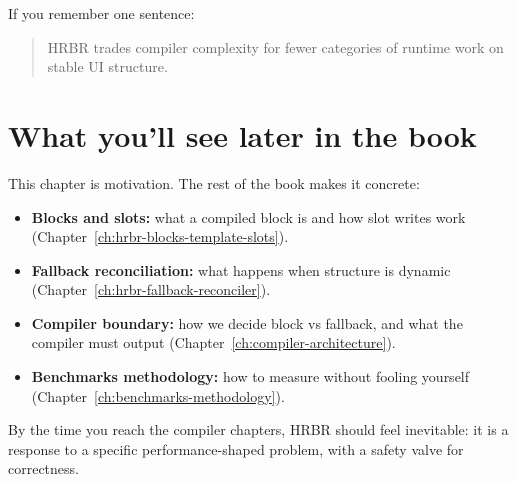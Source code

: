 If you remember one sentence:

\begin{quote}
HRBR trades compiler complexity for fewer categories of runtime work on stable UI structure.
\end{quote}

\section{What you'll see later in the book}

This chapter is motivation.
The rest of the book makes it concrete:

\begin{itemize}
  \item \textbf{Blocks and slots:} what a compiled block is and how slot writes work (Chapter~\ref{ch:hrbr-blocks-template-slots}).
  \item \textbf{Fallback reconciliation:} what happens when structure is dynamic (Chapter~\ref{ch:hrbr-fallback-reconciler}).
  \item \textbf{Compiler boundary:} how we decide block vs fallback, and what the compiler must output (Chapter~\ref{ch:compiler-architecture}).
  \item \textbf{Benchmarks methodology:} how to measure without fooling yourself (Chapter~\ref{ch:benchmarks-methodology}).
\end{itemize}

By the time you reach the compiler chapters, HRBR should feel inevitable: it is a response to a specific performance-shaped problem, with a safety valve for correctness.

